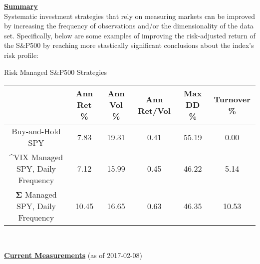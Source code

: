 \documentclass[6pt]{article}
\begin{document}
\textbf{\underline{Summary}} \\

\justify Systematic investment strategies that rely on measuring markets can
be improved by increasing the frequency of observations and/or the dimensionality
of the data set. Specifically, below are some examples of improving the risk-adjusted
return of the S\&P500 by reaching more stastically significant conclusions about the
index's risk profile: \\

\begin{center}
Risk Managed S\&P500 Strategies \\
\begin{tabular}{|c|ccccc|}
  \hline
  & Ann Ret \% & Ann Vol \% & Ann Ret/Vol & Max DD \% & Turnover \% \\
  \hline
  Buy-and-Hold SPY & 7.83 & 19.31 & 0.41 & 55.19 & 0.00 \\
  \^{}VIX Managed SPY, Daily Frequency & 7.12 & 15.99 & 0.45 & 46.22 & 5.14 \\
  $\mathbf{\Sigma}$ Managed SPY, Daily Frequency & 10.45 & 16.65 & 0.63 & 46.35 & 10.53 \\
  \hline
\end{tabular} \\
\end{center}

\vspace{1in}

\textbf{\underline{Current Measurements}} (as of 2017-02-08) \\
\end{document}
